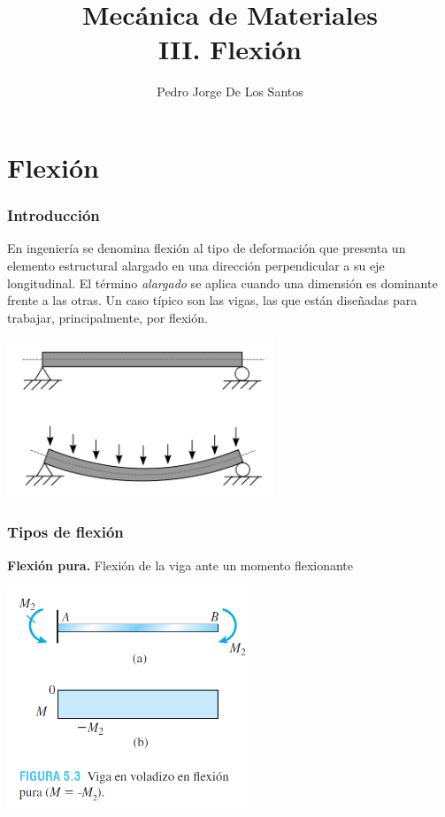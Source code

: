 \documentclass{beamer}
\title{
{\Large Mecánica de Materiales} \\
{\large III. Flexión}
}
\author{Pedro Jorge De Los Santos}
\institute{
    {\bf 
    Instituto Tecnológico de Celaya \\
    Departamento de Ingeniería Mecánica \\
    }
}
\begin{document}
\begin{frame}
\titlepage
\end{frame}

\section{Flexión}

\begin{frame}
\justifying
\frametitle{Introducción}

En ingeniería se denomina flexión al tipo de deformación que presenta un elemento estructural alargado en una 
dirección perpendicular a su eje longitudinal. El término \textit{alargado} se aplica cuando una dimensión es dominante 
frente a las otras. Un caso típico son las vigas, las que están diseñadas para trabajar, principalmente, por flexión.

\begin{center}
\includegraphics[width=0.6\textwidth]{img/bending.png}
\end{center}
\end{frame}


\begin{frame}
\justifying
\frametitle{Tipos de flexión}

\textbf{Flexión pura.} Flexión de la viga ante un momento flexionante

\begin{center}
\includegraphics[width=0.55\textwidth]{img/viga_flexion_pura.PNG}
\end{center}
\end{frame}
\end{document}

